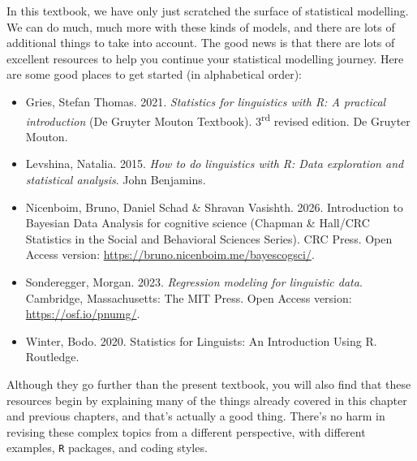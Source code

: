 \documentclass[
  letterpaper,
  DIV=11,
  numbers=noendperiod]{scrreprt}
\providecommand{\tightlist}{%
  \setlength{\itemsep}{0pt}\setlength{\parskip}{0pt}}
\begin{document}
\begin{tcolorbox}[enhanced jigsaw, arc=.35mm, bottomrule=.15mm, bottomtitle=1mm, breakable, colback=white, colbacktitle=quarto-callout-note-color!10!white, colframe=quarto-callout-note-color-frame, coltitle=black, left=2mm, leftrule=.75mm, opacityback=0, opacitybacktitle=0.6, rightrule=.15mm, title=\textcolor{quarto-callout-note-color}{\faInfo}\hspace{0.5em}{Recommended further reading~\emoji{books}}, titlerule=0mm, toprule=.15mm, toptitle=1mm]

In this textbook, we have only just scratched the surface of statistical
modelling. We can do much, much more with these kinds of models, and
there are lots of additional things to take into account. The good news
is that there are lots of excellent resources to help you continue your
statistical modelling journey. Here are some good places to get started
(in alphabetical order):

\begin{itemize}
\tightlist
\item
  Gries, Stefan Thomas. 2021. \emph{Statistics for linguistics with R: A
  practical introduction} (De Gruyter Mouton Textbook).
  3\textsuperscript{rd} revised edition. De Gruyter Mouton.
\item
  Levshina, Natalia. 2015. \emph{How to do linguistics with R: Data
  exploration and statistical analysis}. John Benjamins.
\item
  Nicenboim, Bruno, Daniel Schad \& Shravan Vasishth. 2026. Introduction
  to Bayesian Data Analysis for cognitive science (Chapman \& Hall/CRC
  Statistics in the Social and Behavioral Sciences Series). CRC Press.
  Open Access version: \url{https://bruno.nicenboim.me/bayescogsci/}.
\item
  Sonderegger, Morgan. 2023. \emph{Regression modeling for linguistic
  data}. Cambridge, Massachusetts: The MIT Press. Open Access version:
  \url{https://osf.io/pnumg/}.
\item
  Winter, Bodo. 2020. Statistics for Linguists: An Introduction Using R.
  Routledge.
\end{itemize}

Although they go further than the present textbook, you will also find
that these resources begin by explaining many of the things already
covered in this chapter and previous chapters, and that's actually a
good thing. There's no harm in revising these complex topics from a
different perspective, with different examples, \texttt{R} packages, and
coding styles.

\end{tcolorbox}
\end{document}
